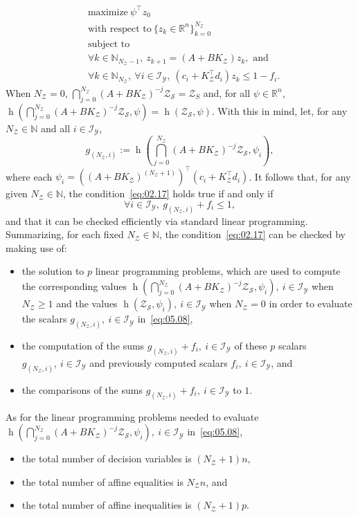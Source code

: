 \documentclass[twocolumn]{autart}
\newcommand{\mb}[1]{\mathbb{#1}}
\newcommand{\mc}[1]{\mathcal{#1}}
\newcommand{\N}{\mb{N}}
\newcommand{\R}{\mb{R}}
\newcommand{\support}[2]{\operatorname{h}(#1,#2)}
\numberwithin{equation}{section}
\begin{document}
\begin{align}
&\text{maximize}\ \psi^\top z_0\nonumber\\
&\text{with respect to}\ \{z_k\in\R^n\}_{k=0}^{N_{\mc{Z}}}\nonumber\\
&\text{subject to}\nonumber\\&\forall k\in\N_{N_{\mc{Z}}-1},\  z_{k+1}=(A+BK_\mc{Z})z_k,\text{ and}\nonumber\\
\label{eq:05.07}
&\forall k\in\N_{N_{\mc{Z}}},\  \forall i\in\mc{I}_\mc{Y},\   (c_i + K_\mc{Z}^\top d_i) z_k\le 1-f_i.
\end{align}
When $N_\mc{Z}=0$, $\bigcap_{j=0}^{N_\mc{Z}}(A+BK_\mc{Z})^{-j}\mc{Z}_\mc{S}=\mc{Z}_S$ and, for all $\psi\in\R^n$, $\support{\bigcap_{j=0}^{N_\mc{Z}}(A+BK_\mc{Z})^{-j}\mc{Z}_\mc{S}}{\psi}=\support{\mc{Z}_\mc{S}}{\psi}$. With this in mind, let,  for any $N_\mc{Z}\in\N$ and all $i\in\mc{I}_\mc{Y}$,
\begin{equation}
\label{eq:05.08}
g_{(N_\mc{Z},i)}:=\support{\bigcap_{j=0}^{N_\mc{Z}}(A+BK_\mc{Z})^{-j}\mc{Z}_\mc{S}}{\psi_i},
\end{equation}
where each $\psi_i=((A+BK_\mc{Z})^{(N_\mc{Z}+1)})^\top (c_i + K_\mc{Z}^\top d_i)$.  It follows that, for any given $N_\mc{Z}\in\N$, the condition~\eqref{eq:02.17} holds true if and only if
\begin{equation}
\label{eq:05.09}
\forall i\in\mc{I}_\mc{Y},\  g_{(N_\mc{Z},i)}+f_i\le 1,
\end{equation}
and that it can be checked efficiently via standard linear programming.
Summarizing, for each fixed $N_\mc{Z}\in\N$, the condition~\eqref{eq:02.17} can be checked by making use of:
\begin{itemize}
\item the solution to $p$ linear programming problems,  which are used to compute the corresponding values $\support{\bigcap_{j=0}^{N_\mc{Z}}(A+BK_\mc{Z})^{-j}\mc{Z}_\mc{S}}{\psi_i},\ i\in\mc{I}_\mc{Y}$ when $N_\mc{Z}\ge 1$ and the values $\support{\mc{Z}_\mc{S}}{\psi_i},\ i\in\mc{I}_\mc{Y}$ when $N_\mc{Z}=0$ in order to evaluate the scalars $g_{(N_\mc{Z},i)},\ i\in\mc{I}_\mc{Y}$ in~\eqref{eq:05.08},
\item  the computation of the sums $g_{(N_\mc{Z},i)}+f_i,\ i\in\mc{I}_\mc{Y}$ of these $p$ scalars $g_{(N_\mc{Z},i)},\ i\in\mc{I}_\mc{Y}$ and previously computed scalars $f_i,\ i\in\mc{I}_\mc{Y}$, and
\item  the comparisons of the  sums $g_{(N_\mc{Z},i)}+f_i,\ i\in\mc{I}_\mc{Y}$ to $1$.
\end{itemize}
As for the linear programming problems needed to evaluate $\support{\bigcap_{j=0}^{N_\mc{Z}}(A+BK_\mc{Z})^{-j}\mc{Z}_\mc{S}}{\psi_i},\ i\in\mc{I}_\mc{Y}$ in~\eqref{eq:05.08},
\begin{itemize}
\item the total number of decision variables is $(N_{\mc{Z}}+1)n$,
\item the total number of affine equalities is $N_{\mc{Z}}n$, and 
\item the total number of affine inequalities is $(N_{\mc{Z}}+1)p$.
\end{itemize}
\end{document}
